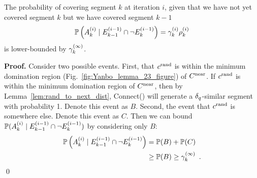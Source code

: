 \begin{lemma}
    The probability of covering segment $k$ at iteration $i$, given that we have not yet covered segment $k$ but we have covered segment $k-1$
    $$\mathbb{P}\left( A_k^{(i)} \mid E_{k-1}^{(i-1)} \cap \neg E_k^{(i-1)} \right) = \gamma_k^{(i)} \rho_k^{(i)}$$
    is lower-bounded by $\gamma_k^{(\infty)}$.
\end{lemma}

\noindent
{\bf Proof.}
Consider two possible events. First, that $c^\textrm{rand}$ is within the minimum domination region (Fig.~\ref{fig:Yanbo_lemma_23_figure}) of $C^{\textrm{near}}$. If $c^\textrm{rand}$ is within the minimum domination region of $C^{\textrm{near}}$, then by Lemma~\ref{lem:rand_to_next_dist}, Connect() will generate a $\delta_q$-similar segment with probability 1. Denote this event as $B$. Second, the event that $c^\textrm{rand}$ is somewhere else. Denote this event as $C$. Then we can bound $\mathbb{P}( A_k^{(i)} \mid E_{k-1}^{(i-1)} \cap \neg E_k^{(i-1)})$ by considering only $B$:
\begin{align*}
    \mathbb{P}\left( A_k^{(i)} \mid E_{k-1}^{(i-1)} \cap \neg E_k^{(i-1)} \right) 
        &= \mathbb{P}(B) + \mathbb{P}(C) \\
        &\geq \mathbb{P}(B) \geq \gamma_k^{(\infty)} \enspace .
\end{align*}
\qed
